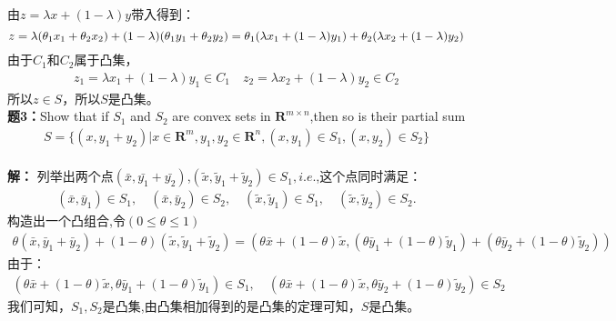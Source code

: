 \documentclass[12pt,a4paper]{article}
\begin{document}
由\(z=\lambda x +(1-\lambda)y\)带入得到：
\begin{equation*}
	z=\lambda(\theta_1 x_1+\theta_2 x_2)+(1-\lambda)(\theta_1 y_1+\theta_2 y_2) \\
	=\theta_1(\lambda x_1+(1-\lambda)y_1)+\theta_2(\lambda x_2+(1-\lambda)y_2)
\end{equation*}
由于\(C_1\)和\(C_2\)属于凸集，
\begin{align*}
	z_1=\lambda x_1+(1-\lambda)y_1 \in C_1 \quad z_2 = \lambda x_2+(1-\lambda)y_2 \in C_2
\end{align*}
所以\(z \in S\)，所以\(S\)是凸集。\\

\vspace{5pt}
\noindent
{\bf 题3：}Show that if $S_1$ and $S_2$ are convex sets in $\mathbf{R}^{m \times n}$,then so is their partial sum
\begin{align*}
	S=\{(x,y_1+y_2)|x \in \mathbf{R}^m,y_1,y_2 \in \mathbf{R}^n ,(x,y_1) \in S_1,(x,y_2) \in S_2\}
\end{align*}
\vspace{5pt}
\noindent \\
{\bf 解：}
列举出两个点$(\bar{x},\bar{y_1}+\bar{y_2})$,$(\tilde{x},\tilde{y}_1+\tilde{y}_2) \in S_1,i.e.$,这个点同时满足：
\begin{align*}
	(\bar{x},\bar{y}_1)\in S_1,\quad(\bar{x},\bar{y}_2)\in S_2,\quad(\tilde{x},\tilde{y}_1)\in S_1,\quad(\tilde{x},\tilde{y}_2)\in S_2.
\end{align*}
构造出一个凸组合,令$(0\le \theta \le 1)$
\begin{align*}
	\theta(\bar{x},\bar{y}_1+\bar{y}_2)+(1-\theta)(\tilde{x},\tilde{y}_1+\tilde{y}_2)=(\theta\bar{x}+(1-\theta)\tilde{x},(\theta\bar{y}_1+(1-\theta)\tilde{y}_1)+(\theta\bar{y}_2+(1-\theta)\tilde{y}_2))
\end{align*}
由于：
\begin{align*}
	(\theta \bar{x}+(1-\theta)\tilde{x},\theta\bar{y}_1+(1-\theta)\tilde{y}_1) \in S_1, \quad (\theta \bar{x}+(1-\theta)\tilde{x},\theta\bar{y}_2+(1-\theta)\tilde{y}_2) \in S_2
\end{align*}
我们可知，$S_1,S_2$是凸集,由凸集相加得到的是凸集的定理可知，$S$是凸集。


\vspace{10pt}
\noindent
\end{document}
